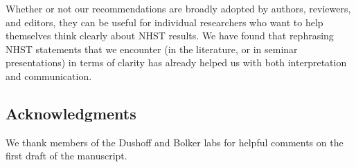 Whether or not our recommendations are broadly adopted by authors, reviewers, and editors, they can be useful for individual researchers who want to help themselves think clearly about NHST results. We have found that rephrasing NHST statements that we encounter (in the literature, or in seminar presentations) in terms of clarity has already helped us with both interpretation and communication.

\subsection*{Acknowledgments}

We thank members of the Dushoff and Bolker labs for helpful comments on the first draft of the manuscript.
